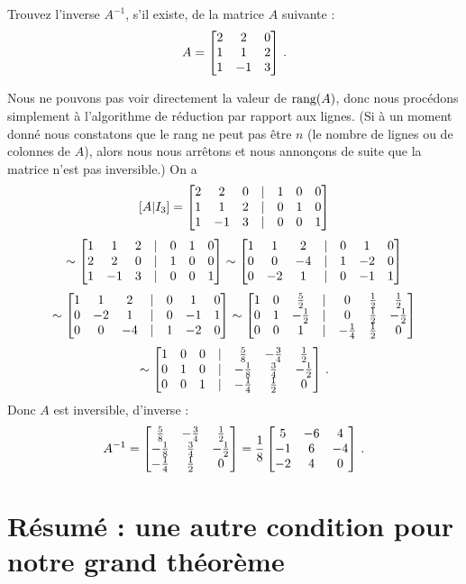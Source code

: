 \begin{myprob} Trouvez l'inverse $A^{-1}$, s'il existe, de la matrice $A$ suivante :
$$
A = \left[ \begin{matrix} 2 & 2 & 0 \\ 1 & 1 & 2\\ 1 & -1 & 3 \end{matrix} \right]\,.
$$

\begin{mysol}  Nous ne pouvons pas voir directement la valeur de $\textrm{rang}(A)$, donc nous procédons simplement
à l'algorithme de réduction par rapport aux lignes.  (Si à un moment donné nous constatons que le rang ne peut pas \^etre $n$ (le nombre de lignes ou de colonnes de $A$), alors
nous nous arrêtons et nous annonçons de suite que la matrice n'est pas inversible.) On a
$$
[A|I_3] = \left[ \begin{matrix} 
2 & 2 & 0 &|& 1 & 0 & 0\\ 
1 & 1 & 2 &|& 0 & 1 & 0\\ 
1 & -1 & 3&|& 0 & 0 & 1 \end{matrix} \right]
$$
$$
\sim \left[ \begin{matrix} 
1 & 1 & 2 &|& 0 & 1 & 0\\ 
2 & 2 & 0 &|& 1 & 0 & 0\\ 
1 & -1 & 3&|& 0 & 0 & 1 \end{matrix} \right]
\sim
\left[ \begin{matrix} 
1 & 1 & 2 &|& 0 & 1 & 0\\ 
0 & 0 & -4 &|& 1 & -2 & 0\\ 
0 & -2 & 1&|& 0 & -1 & 1 \end{matrix} \right]
$$
$$
\sim \left[ \begin{matrix} 
1 & 1 & 2 &|& 0 & 1 & 0\\ 
0 & -2 & 1&|& 0 & -1 & 1\\
0 & 0 & -4 &|& 1 & -2 & 0 \end{matrix} \right]
\sim \left[ \begin{matrix} 
1 & 0 & \frac52 &|& 0 & \frac12 & \frac12\\ 
0 & 1 & -\frac12 &|& 0 & \frac12 & -\frac12\\
0 & 0 & 1 &|& -\frac14 & \frac12 & 0 \end{matrix} \right]
$$
$$
\sim \left[ \begin{matrix} 
1 & 0 & 0 &|& \frac58 & -\frac34 & \frac12\\ 
0 & 1 & 0 &|& -\frac18 & \frac34 & -\frac12\\
0 & 0 & 1 &|& -\frac14 & \frac12 & 0 \end{matrix} \right]\,.
$$
Donc $A$ est inversible, d'inverse :
$$
A^{-1} = \left[ \begin{matrix} 
  \frac58 & -\frac34 & \frac12\\ 
 -\frac18 & \frac34 & -\frac12\\
 -\frac14 & \frac12 & 0 \end{matrix} \right] = 
\frac18\left[ \begin{matrix} 
5 & -6 & 4\\ 
-1 & 6 & -4\\ 
-2 & 4 & 0 \end{matrix} \right]\,.
$$
\end{mysol}\end{myprob}

\section{Résumé : une autre condition pour notre grand théorème}

